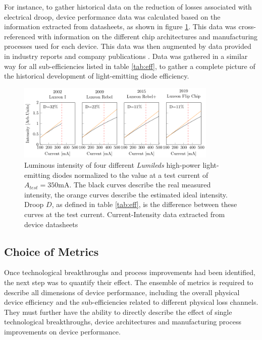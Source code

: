 \documentclass[a4paper,nocompress]{spie}  %
\begin{document}
        For instance, to gather historical data on the reduction of losses associated with electrical droop, device performance data was calculated based on the information extracted from datasheets, as shown in figure \ref{fig:droop}. This data was cross-referenced with information on the different chip architectures and manufacturing processes used for each device. This data was then augmented by data provided in industry reports and company publications \cite{osram2014osram}. Data was gathered in a similar way for all sub-efficiencies listed in table \ref{tab:eff}, to gather a complete picture of the historical development of light-emitting diode efficiency.

        \begin{figure} [ht]
            \begin{center}
                \includegraphics[width=0.85\textwidth]{SPIE/article/droop_lumileds.pdf}
            \end{center}
            \caption{Luminous intensity of four different \textit{Lumileds} high-power light-emitting diodes normalized to the value at a test current of $A_{test}=350$mA. The black curves describe the real measured intensity, the orange curves describe the estimated ideal intensity. Droop $D$, as defined in table \ref{tab:eff}, is the difference between these curves at the test current. Current-Intensity data extracted from device datasheets \cite{datasheet_lumileds_lux1,datasheet_lumileds_rebel,datasheet_lumileds_rebplus,lumi2019data}}
            \label{fig:droop}
        \end{figure}

\subsection{Choice of Metrics}

    Once technological breakthroughs and process improvements had been identified, the next step was to quantify their effect. The ensemble of metrics is required to describe all dimensions of device performance, including the overall physical device efficiency and the sub-efficiencies related to different physical loss channels. They must further have the ability to directly describe the effect of single technological breakthroughs, device architectures and manufacturing process improvements on device performance. 
    
\end{document}
